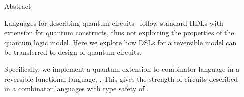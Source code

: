 \documentclass[final]{beamer}
\newlength{\sepwid}
\newlength{\onecolwid}
\begin{document}
\begin{frame}[t] %
%
\begin{columns}[t,onlytextwidth] %

\begin{column}{\onecolwid} %


\begin{alertblock}{Abstract}

Languages for describing quantum circuits~\cite{ChongEtAl:2017:Qlang} follow standard HDLs with extension for quantum constructs, thus not exploiting the properties of the quantum logic model.
%
Here we explore how DSLs for a reversible model can be transferred to design of quantum circuits.

Specifically, we implement a quantum extension to combinator language \cite{Thomsen:2012:IFL} in a reversible functional language, \rfun. This gives the strength of circuits described in a combinator languages with type safety of \rfun.



\end{alertblock}

\end{column}

\begin{column}{\sepwid}~\end{column} %


\end{columns}
\end{frame}
\end{document}
